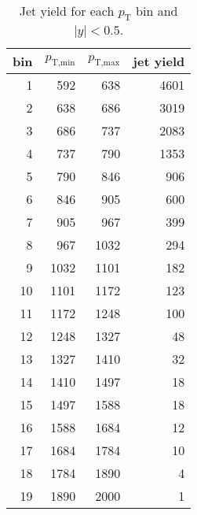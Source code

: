 
\begin{table}[htp]
  \caption{Jet yield for each $p_\textrm{T}$ bin and $|y| < 0.5$.}
  \label{tab:yield}
  \medskip
  \centering
  \begin{tabular}{|r|rr|r|}
  \hline
  bin	& $p_\textrm{T,min}$	& $p_\textrm{T,max}$	& jet yield \\ \hline
    1	&     592	&     638	&      4601	\\ \hline
   2	&     638	&     686	&      3019	\\ \hline
   3	&     686	&     737	&      2083	\\ \hline
   4	&     737	&     790	&      1353	\\ \hline
   5	&     790	&     846	&       906	\\ \hline
   6	&     846	&     905	&       600	\\ \hline
   7	&     905	&     967	&       399	\\ \hline
   8	&     967	&    1032	&       294	\\ \hline
   9	&    1032	&    1101	&       182	\\ \hline
  10	&    1101	&    1172	&       123	\\ \hline
  11	&    1172	&    1248	&       100	\\ \hline
  12	&    1248	&    1327	&        48	\\ \hline
  13	&    1327	&    1410	&        32	\\ \hline
  14	&    1410	&    1497	&        18	\\ \hline
  15	&    1497	&    1588	&        18	\\ \hline
  16	&    1588	&    1684	&        12	\\ \hline
  17	&    1684	&    1784	&        10	\\ \hline
  18	&    1784	&    1890	&         4	\\ \hline
  19	&    1890	&    2000	&         1	\\ \hline
\end{tabular}
\end{table}

